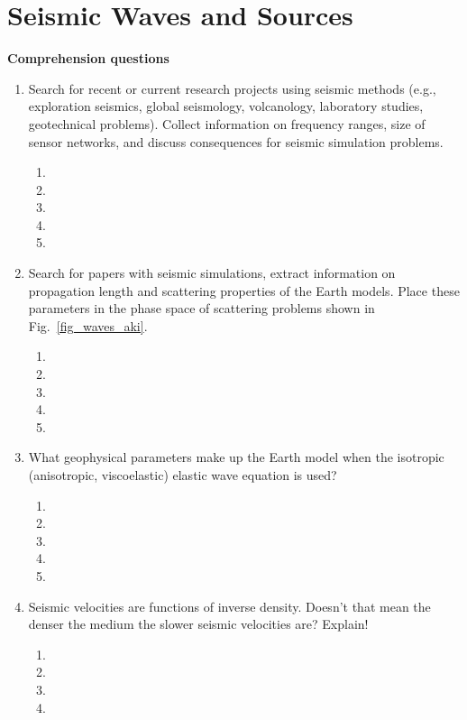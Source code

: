 
\chapter{Seismic Waves and Sources}

{\bf Comprehension questions}
\begin{enumerate}
\item
Search for recent or current research projects using seismic methods (e.g., exploration seismics, global seismology, volcanology, laboratory studies, geotechnical problems). Collect information on frequency ranges, size of sensor networks, and discuss consequences for seismic simulation problems.
\begin{enumerate}
\item[]
\item[]
\item[] 
\item[]
\item[] 
\end{enumerate}
\item
Search for papers with seismic simulations, extract information on propagation length and scattering properties of the Earth models. Place these parameters in the phase space of scattering problems shown in Fig.~\ref{fig_waves_aki}.
\begin{enumerate}
\item[]
\item[]
\item[] 
\item[]
\item[] 
\end{enumerate}
\item
What geophysical parameters make up the Earth model when the isotropic (anisotropic, viscoelastic) elastic wave equation is used? 
\begin{enumerate}
\item[]
\item[]
\item[] 
\item[]
\item[] 
\end{enumerate}
\item
Seismic velocities are functions of inverse density. Doesn't that mean the denser the medium the slower seismic velocities are? Explain! 
\begin{enumerate}
\item[]
\item[]
\item[] 
\item[]

\end{enumerate}
\end{enumerate}
